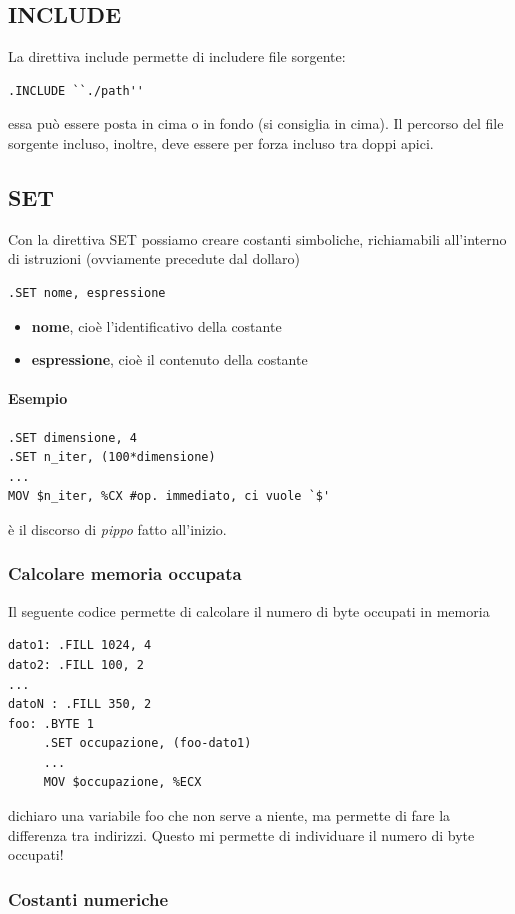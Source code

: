 \documentclass[11pt]{report}
\begin{document}
\subsection{INCLUDE}
La direttiva include permette di includere file sorgente:
\begin{verbatim}
.INCLUDE ``./path''
\end{verbatim}
essa può essere posta in cima o in fondo (si consiglia in cima). Il percorso del file sorgente incluso, inoltre, deve essere per forza incluso tra doppi apici.

\subsection{SET}
Con la direttiva SET possiamo creare costanti simboliche, richiamabili all'interno di istruzioni (ovviamente precedute dal dollaro)
\begin{verbatim}
.SET nome, espressione
\end{verbatim}
\begin{itemize}
\item \textbf{nome}, cioè l'identificativo della costante
\item \textbf{espressione}, cioè il contenuto della costante
\end{itemize}
\paragraph{Esempio}
\begin{verbatim}
.SET dimensione, 4
.SET n_iter, (100*dimensione)
...
MOV $n_iter, %CX #op. immediato, ci vuole `$'
\end{verbatim}
è il discorso di \emph{pippo} fatto all'inizio.
\subsubsection{Calcolare memoria occupata}
Il seguente codice permette di calcolare il numero di byte occupati in memoria
\begin{verbatim}
dato1: .FILL 1024, 4
dato2: .FILL 100, 2
...
datoN : .FILL 350, 2
foo: .BYTE 1
     .SET occupazione, (foo-dato1)
     ...
     MOV $occupazione, %ECX
\end{verbatim}
dichiaro una variabile foo che non serve a niente, ma permette di fare la differenza tra indirizzi. Questo mi permette di individuare il numero di byte occupati!
\subsubsection{Costanti numeriche}
\end{document}
